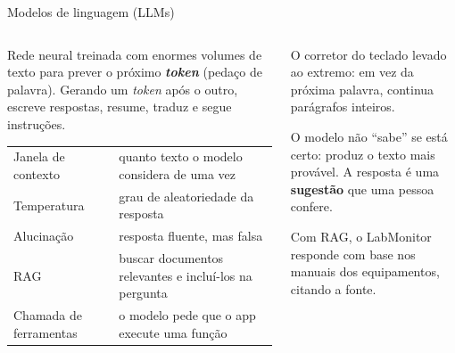 \begin{frame}{Modelos de linguagem (LLMs)}
  \begin{columns}[T]
    \begin{column}{0.5\textwidth}
      \begin{definicao}
        Rede neural treinada com enormes volumes de texto para prever o próximo \textbf{\emph{token}} (pedaço de palavra). Gerando um \emph{token} após o outro, escreve respostas, resume, traduz e segue instruções.
      \end{definicao}
      \scriptsize
      \begin{tabularx}{\linewidth}{@{}l L@{}}
        \toprule
         &  \\
        \midrule
        Janela de contexto & quanto texto o modelo considera de uma vez \\
        Temperatura & grau de aleatoriedade da resposta \\
        Alucinação & resposta fluente, mas falsa \\
        RAG & buscar documentos relevantes e incluí-los na pergunta \\
        Chamada de ferramentas & o modelo pede que o app execute uma função \\
        \bottomrule
      \end{tabularx}
    \end{column}
    \begin{column}{0.48\textwidth}
      \begin{analogia}
        O corretor do teclado levado ao extremo: em vez da próxima palavra, continua parágrafos inteiros.
      \end{analogia}
      \begin{atencao}
        O modelo não ``sabe'' se está certo: produz o texto mais provável. A resposta é uma \textbf{sugestão} que uma pessoa confere.
      \end{atencao}
      \begin{dica}
        Com RAG, o LabMonitor responde com base nos manuais dos equipamentos, citando a fonte.
      \end{dica}
    \end{column}
  \end{columns}
\end{frame}

